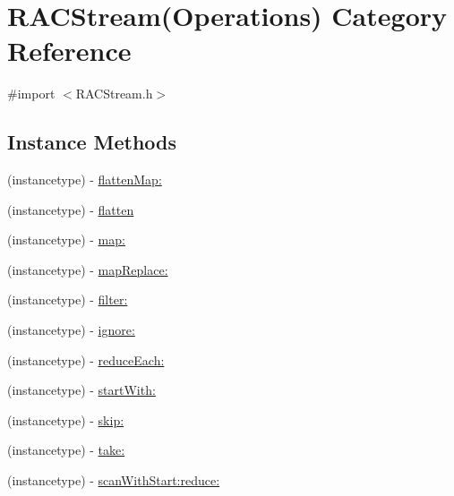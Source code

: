 \hypertarget{category_r_a_c_stream_07_operations_08}{}\section{R\+A\+C\+Stream(Operations) Category Reference}
\label{category_r_a_c_stream_07_operations_08}


{\ttfamily \#import $<$R\+A\+C\+Stream.\+h$>$}

\subsection*{Instance Methods}
\begin{DoxyCompactItemize}
\item 
(instancetype) -\/ \mbox{\hyperlink{category_r_a_c_stream_07_operations_08_a2441b0306adc6ae2845219f8b116119a}{flatten\+Map\+:}}
\item 
(instancetype) -\/ \mbox{\hyperlink{category_r_a_c_stream_07_operations_08_a02767823dfe3d4682709e066e15e388c}{flatten}}
\item 
(instancetype) -\/ \mbox{\hyperlink{category_r_a_c_stream_07_operations_08_ae8e14cc70fb3979e6128d28b003bba3f}{map\+:}}
\item 
(instancetype) -\/ \mbox{\hyperlink{category_r_a_c_stream_07_operations_08_a9e55da434f4cf84e14f9133ac48383b8}{map\+Replace\+:}}
\item 
(instancetype) -\/ \mbox{\hyperlink{category_r_a_c_stream_07_operations_08_ae6a990d05708acea33f1c31102f4989b}{filter\+:}}
\item 
(instancetype) -\/ \mbox{\hyperlink{category_r_a_c_stream_07_operations_08_aa0bf73c86006176e745390ee2b3645b2}{ignore\+:}}
\item 
(instancetype) -\/ \mbox{\hyperlink{category_r_a_c_stream_07_operations_08_aaf04bf295d943b85860ae5cc3d5851ff}{reduce\+Each\+:}}
\item 
(instancetype) -\/ \mbox{\hyperlink{category_r_a_c_stream_07_operations_08_a2f255fad695085b91a1ebc1e0a78c865}{start\+With\+:}}
\item 
(instancetype) -\/ \mbox{\hyperlink{category_r_a_c_stream_07_operations_08_a1525f1607d8ff7f04a0afc1a5193436a}{skip\+:}}
\item 
(instancetype) -\/ \mbox{\hyperlink{category_r_a_c_stream_07_operations_08_af0264b38dc4acd9334d2e42b1ce21b05}{take\+:}}
\item 
(instancetype) -\/ \mbox{\hyperlink{category_r_a_c_stream_07_operations_08_aa86990e9bc4cbc3dff2815f56b907b41}{scan\+With\+Start\+:reduce\+:}}

\end{DoxyCompactItemize}
